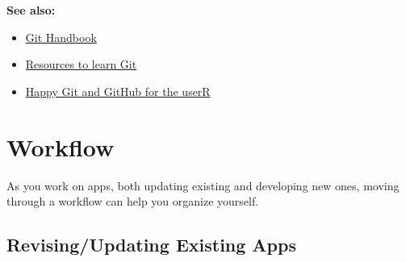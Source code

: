 \documentclass[
]{book}
\providecommand{\tightlist}{%
  \setlength{\itemsep}{0pt}\setlength{\parskip}{0pt}}
\begin{document}
\textbf{See also:}

\begin{itemize}
\tightlist
\item
  \href{https://guides.github.com/introduction/git-handbook/}{Git Handbook}
\item
  \href{https://try.github.io/}{Resources to learn Git}
\item
  \href{https://happygitwithr.com/}{Happy Git and GitHub for the userR}
\end{itemize}

\hypertarget{workflow}{%
\section{Workflow}\label{workflow}}

As you work on apps, both updating existing and developing new ones, moving through a workflow can help you organize yourself.

\hypertarget{revisingupdating-existing-apps}{%
\subsection{Revising/Updating Existing Apps}\label{revisingupdating-existing-apps}}
\end{document}
